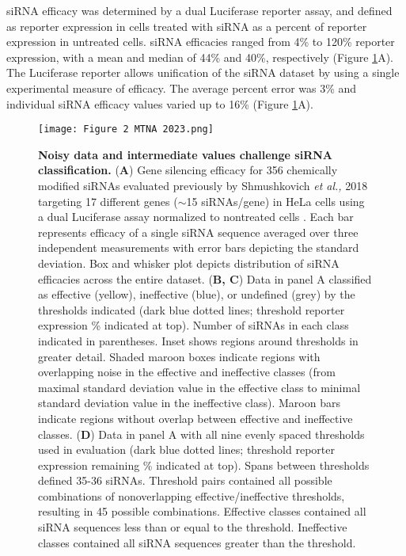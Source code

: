 \documentclass{report}
\begin{document}
 siRNA efficacy was determined by a dual Luciferase reporter assay,\cite{shmushkovich_functional_2018} and defined as reporter expression in cells treated with siRNA as a percent of reporter expression in untreated cells. siRNA efficacies ranged from 4\% to 120\% reporter expression, with a mean and median of 44\% and 40\%, respectively (Figure \ref{fig:Figure* 2}A). The Luciferase reporter allows unification of the siRNA dataset by using a single experimental measure of efficacy. The average percent error was 3\% and individual siRNA efficacy values varied up to 16\% (Figure \ref{fig:Figure* 2}A).

 \begin{figure}
     \centering
     \texttt{[image: Figure 2 MTNA 2023.png]}
     \caption{\textbf{Noisy data and intermediate values challenge siRNA classification. }(\textbf{A}) Gene silencing efficacy for 356 chemically modified siRNAs evaluated previously by Shmushkovich \textit{et al.,} 2018 targeting 17 different genes ($\sim$15 siRNAs/gene) in HeLa cells using a dual Luciferase assay normalized to nontreated cells \cite{shmushkovich_functional_2018}. Each bar represents efficacy of a single siRNA sequence averaged over three independent measurements with error bars depicting the standard deviation. Box and whisker plot depicts distribution of siRNA efficacies across the entire dataset. (\textbf{B, C}) Data in panel A classified as effective (yellow), ineffective (blue), or undefined (grey) by the thresholds indicated (dark blue dotted lines; threshold reporter expression \% indicated at top). Number of siRNAs in each class indicated in parentheses. Inset shows regions around thresholds in greater detail. Shaded maroon boxes indicate regions with overlapping noise in the effective and ineffective classes (from maximal standard deviation value in the effective class to minimal standard deviation value in the ineffective class). Maroon bars indicate regions without overlap between effective and ineffective classes. (\textbf{D}) Data in panel A with all nine evenly spaced thresholds used in evaluation (dark blue dotted lines; threshold reporter expression remaining \% indicated at top). Spans between thresholds defined 35-36 siRNAs. Threshold pairs contained all possible combinations of nonoverlapping effective/ineffective thresholds, resulting in 45 possible combinations. Effective classes contained all siRNA sequences less than or equal to the threshold. Ineffective classes contained all siRNA sequences greater than the threshold. 
}
     \label{fig:Figure* 2}
 \end{figure}
\end{document}
